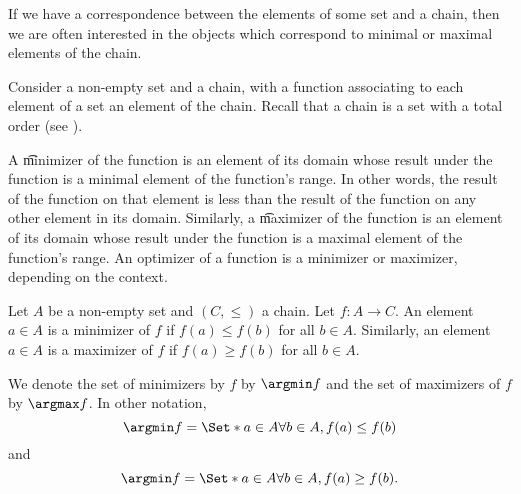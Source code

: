 

If we have a correspondence between the elements of some set and a chain, then we are often interested in the objects which correspond to minimal or maximal elements of the chain.


Consider a non-empty set and a chain, with a function associating to each element of a set an element of the chain.
Recall that a chain is a set with a total order (see ).

A \t{minimizer} of the function is an element of its domain whose result under the function is a minimal element of the function's range.
In other words, the result of the function on that element is less than the result of the function on any other element in its domain.
Similarly, a \t{maximizer} of the function is an element of its domain whose result under the function is a maximal element of the function's range.
An optimizer of a function is a minimizer or maximizer, depending on the context.


Let $A$ be a non-empty set and $(C, \leq)$ a chain.
Let $f: A \to C$.
An element $a \in A$ is a minimizer of $f$ if $f(a) \leq f(b)$ for all $b \in A$.
Similarly, an element $a \in A$ is a maximizer of $f$ if $f(a) \geq f(b)$ for all $b \in A$.

We denote the set of minimizers by $f$ by $\argmin f$ and the set of maximizers of $f$ by $\argmax f$. In other notation,
$$
  \argmin f = \Set*{a \in A}{\forall b \in A, f(a) \leq f(b) }
$$
and
$$
  \argmin f = \Set*{a \in A}{\forall b \in A, f(a) \geq f(b) }.
$$
